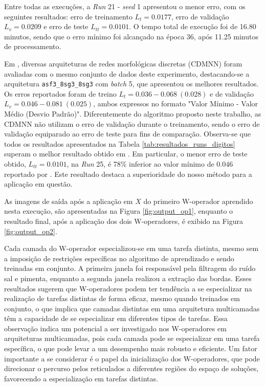 Entre todas as execuções, a \textit{Run} 21 - \textit{seed} 1 apresentou o menor erro, com os seguintes resultados: erro de treinamento $L_{t} = 0.0177$, erro de validação $L_{v} = 0.0209$ e erro de teste $L_{tt} = 0.0101$. O tempo total de execução foi de 16.80 minutos, sendo que o erro mínimo foi alcançado na época 36, após 11.25 minutos de processamento. 

Em \cite{DIEGO:DMM}, diversas arquiteturas de redes morfológicas discretas (CDMNN) foram avaliadas com o mesmo conjunto de dados deste experimento, destacando-se a arquitetura \texttt{asf3\_8sg3\_8sg3} com \textit{batch} 5, que apresentou os melhores resultados. Os erros reportados foram de treino $L_{t} = 0.036 - 0.068 \ (0.028)$ e de validação $L_{v} = 0.046 - 0.081 \ (0.025)$, ambos expressos no formato "Valor Mínimo - Valor Médio (Desvio Padrão)". Diferentemente do algoritmo proposto neste trabalho, as CDMNN não utilizam o erro de validação durante o treinamento, sendo o erro de validação equiparado ao erro de teste para fins de comparação. Observa-se que todos os resultados apresentados na Tabela \ref{tab:resultados_runs_digitos} superam o melhor resultado obtido em \cite{DIEGO:DMM}. Em particular, o menor erro de teste obtido, $L_{tt} = 0.0101$, na \textit{Run} 25, é 78\% inferior ao valor mínimo de $0.046$ reportado por \cite{DIEGO:DMM}. Este resultado destaca a superioridade do nosso método para a aplicação em questão.

As imagens de saída após a aplicação em $X$ do primeiro W-operador aprendido nesta execução, são apresentadas na Figura \ref{fig:output_op1}, enquanto o resultado final, após a aplicação dos dois W-operadores, é exibido na Figura \ref{fig:output_op2}. 

Cada camada do W-operador especializou-se em uma tarefa distinta, mesmo sem a imposição de restrições específicas no algoritmo de aprendizado e sendo treinadas em conjunto. A primeira janela foi responsável pela filtragem do ruído sal e pimenta, enquanto a segunda janela realizou a extração das bordas. Esses resultados sugerem que W-operadores podem ter tendência a se especializar na realização de tarefas distintas de forma eficaz, mesmo quando treinados em conjunto, o que implica que camadas distintas em uma arquitetura multicamadas têm a capacidade de se especializar em diferentes tipos de tarefas. Essa observação indica um potencial a ser investigado nos W-operadores em arquiteturas multicamadas, pois cada camada pode se especializar em uma tarefa específica, o que pode levar a um desempenho mais robusto e eficiente. Um fator importante a se considerar é o papel da inicialização dos W-operadores, que pode direcionar o percurso pelos reticulados a diferentes regiões do espaço de soluções, favorecendo a especialização em tarefas distintas.

